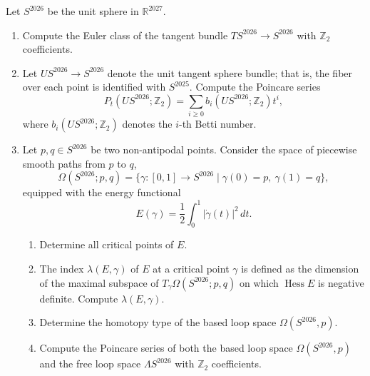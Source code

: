 \begin{exercise}
\label{geometry:2026:4}
Let $S^{2026}$ be the unit sphere in $\mathbb{R}^{2027}$.
\begin{enumerate}
    \item Compute the Euler class of the tangent bundle
    $TS^{2026}\to S^{2026}$ with $\mathbb{Z}_2$ coefficients.
    \item Let $US^{2026}\to S^{2026}$ denote the unit tangent sphere bundle; that is,
    the fiber over each point is identified with $S^{2025}$. Compute the Poincare
    series
    \[
        P_t(US^{2026};\mathbb{Z}_2)
        =
        \sum_{i\geq 0} b_i(US^{2026};\mathbb{Z}_2)t^i,
    \]
    where $b_i(US^{2026};\mathbb{Z}_2)$ denotes the $i$-th Betti number.
    \item Let $p,q\in S^{2026}$ be two non-antipodal points. Consider the space of
    piecewise smooth paths from $p$ to $q$,
    \[
        \Omega(S^{2026};p,q)
        =
        \{\gamma:[0,1]\to S^{2026}\mid \gamma(0)=p,\ \gamma(1)=q\},
    \]
    equipped with the energy functional
    \[
        E(\gamma)=\frac{1}{2}\int_0^1 |\dot{\gamma}(t)|^2\,dt.
    \]
    \begin{enumerate}
        \item Determine all critical points of $E$.
        \item The index $\lambda(E,\gamma)$ of $E$ at a critical point $\gamma$ is
        defined as the dimension of the maximal subspace of
        $T_{\gamma}\Omega(S^{2026};p,q)$ on which $\operatorname{Hess}E$ is negative
        definite. Compute $\lambda(E,\gamma)$.
        \item Determine the homotopy type of the based loop space
        $\Omega(S^{2026},p)$.
        \item Compute the Poincare series of both the based loop space
        $\Omega(S^{2026},p)$ and the free loop space $\Lambda S^{2026}$ with
        $\mathbb{Z}_2$ coefficients.
    \end{enumerate}
\end{enumerate}
\end{exercise}

